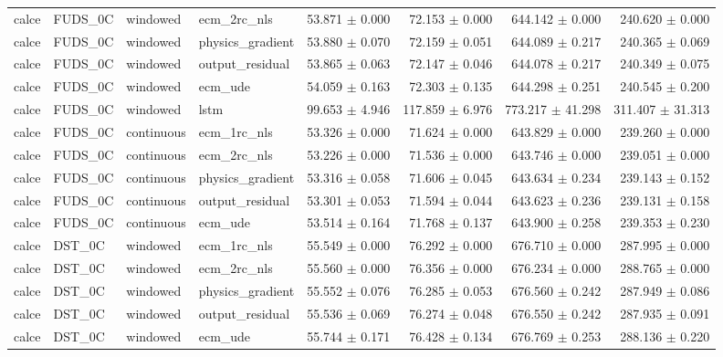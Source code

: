 \begin{longtable}{llllrrrr}
calce & FUDS\_0C & windowed & ecm\_2rc\_nls & 53.871 $\pm$ 0.000 & 72.153 $\pm$ 0.000 & 644.142 $\pm$ 0.000 & 240.620 $\pm$ 0.000 \\
calce & FUDS\_0C & windowed & physics\_gradient & 53.880 $\pm$ 0.070 & 72.159 $\pm$ 0.051 & 644.089 $\pm$ 0.217 & 240.365 $\pm$ 0.069 \\
calce & FUDS\_0C & windowed & output\_residual & 53.865 $\pm$ 0.063 & 72.147 $\pm$ 0.046 & 644.078 $\pm$ 0.217 & 240.349 $\pm$ 0.075 \\
calce & FUDS\_0C & windowed & ecm\_ude & 54.059 $\pm$ 0.163 & 72.303 $\pm$ 0.135 & 644.298 $\pm$ 0.251 & 240.545 $\pm$ 0.200 \\
calce & FUDS\_0C & windowed & lstm & 99.653 $\pm$ 4.946 & 117.859 $\pm$ 6.976 & 773.217 $\pm$ 41.298 & 311.407 $\pm$ 31.313 \\
calce & FUDS\_0C & continuous & ecm\_1rc\_nls & 53.326 $\pm$ 0.000 & 71.624 $\pm$ 0.000 & 643.829 $\pm$ 0.000 & 239.260 $\pm$ 0.000 \\
calce & FUDS\_0C & continuous & ecm\_2rc\_nls & 53.226 $\pm$ 0.000 & 71.536 $\pm$ 0.000 & 643.746 $\pm$ 0.000 & 239.051 $\pm$ 0.000 \\
calce & FUDS\_0C & continuous & physics\_gradient & 53.316 $\pm$ 0.058 & 71.606 $\pm$ 0.045 & 643.634 $\pm$ 0.234 & 239.143 $\pm$ 0.152 \\
calce & FUDS\_0C & continuous & output\_residual & 53.301 $\pm$ 0.053 & 71.594 $\pm$ 0.044 & 643.623 $\pm$ 0.236 & 239.131 $\pm$ 0.158 \\
calce & FUDS\_0C & continuous & ecm\_ude & 53.514 $\pm$ 0.164 & 71.768 $\pm$ 0.137 & 643.900 $\pm$ 0.258 & 239.353 $\pm$ 0.230 \\
calce & DST\_0C & windowed & ecm\_1rc\_nls & 55.549 $\pm$ 0.000 & 76.292 $\pm$ 0.000 & 676.710 $\pm$ 0.000 & 287.995 $\pm$ 0.000 \\
calce & DST\_0C & windowed & ecm\_2rc\_nls & 55.560 $\pm$ 0.000 & 76.356 $\pm$ 0.000 & 676.234 $\pm$ 0.000 & 288.765 $\pm$ 0.000 \\
calce & DST\_0C & windowed & physics\_gradient & 55.552 $\pm$ 0.076 & 76.285 $\pm$ 0.053 & 676.560 $\pm$ 0.242 & 287.949 $\pm$ 0.086 \\
calce & DST\_0C & windowed & output\_residual & 55.536 $\pm$ 0.069 & 76.274 $\pm$ 0.048 & 676.550 $\pm$ 0.242 & 287.935 $\pm$ 0.091 \\
calce & DST\_0C & windowed & ecm\_ude & 55.744 $\pm$ 0.171 & 76.428 $\pm$ 0.134 & 676.769 $\pm$ 0.253 & 288.136 $\pm$ 0.220 \\

\end{longtable}
